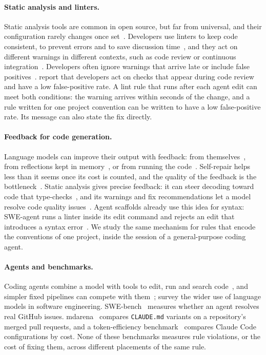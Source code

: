 \documentclass[pdflatex,sn-mathphys-num]{sn-jnl}
\newcommand{\file}[1]{\texttt{#1}}
\begin{document}
\paragraph{Static analysis and linters.}
Static analysis tools are common in open source, but far from universal, and their configuration rarely changes once set~\cite{beller2016static}.
Developers use linters to keep code consistent, to prevent errors and to save discussion time~\cite{tomasdottir2017linters}, and they act on different warnings in different contexts, such as code review or continuous integration~\cite{vassallo2020static}.
Developers often ignore warnings that arrive late or include false positives~\cite{johnson2013static,sadowski2018google}.
\citet{sadowski2018google} report that developers act on checks that appear during code review and have a low false-positive rate.
A lint rule that runs after each agent edit can meet both conditions: the warning arrives within seconds of the change, and a rule written for one project convention can be written to have a low false-positive rate.
Its message can also state the fix directly.

\paragraph{Feedback for code generation.}
Language models can improve their output with feedback: from themselves~\cite{madaan2023selfrefine}, from reflections kept in memory~\cite{shinn2023reflexion}, or from running the code~\cite{chen2024selfdebug}.
Self-repair helps less than it seems once its cost is counted, and the quality of the feedback is the bottleneck~\cite{olausson2024selfrepair}.
Static analysis gives precise feedback: it can steer decoding toward code that type-checks~\cite{agrawal2023monitors}, and its warnings and fix recommendations let a model resolve code quality issues~\cite{wadhwa2024core,liu2024refining}.
Agent scaffolds already use this idea for syntax: SWE-agent runs a linter inside its edit command and rejects an edit that introduces a syntax error~\cite{yang2024sweagent}.
We study the same mechanism for rules that encode the conventions of one project, inside the session of a general-purpose coding agent.

\paragraph{Agents and benchmarks.}
Coding agents combine a model with tools to edit, run and search code~\cite{yang2024sweagent,wang2025openhands,zhang2024autocoderover}, and simpler fixed pipelines can compete with them~\cite{xia2025agentless}; \citet{hou2024llm4se} survey the wider use of language models in software engineering.
SWE-bench~\cite{jimenez2024swebench} measures whether an agent resolves real GitHub issues.
mdarena~\cite{mdarena} compares \file{CLAUDE.md} variants on a repository's merged pull requests, and a token-efficiency benchmark~\cite{peker2026tokeneff} compares Claude Code configurations by cost.
None of these benchmarks measures rule violations, or the cost of fixing them, across different placements of the same rule.
\end{document}
